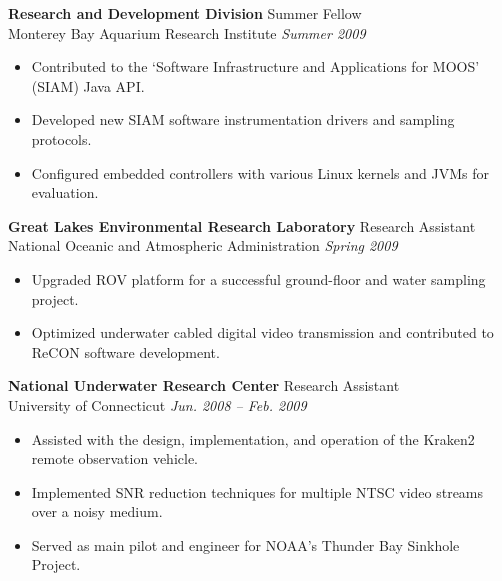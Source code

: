 \documentclass{article}
\begin{document}
{\begin{multicols}{2}
    \textbf{Research and Development Division} \hfill Summer Fellow \\ 
    Monterey Bay Aquarium Research Institute \hfill \textsl{Summer 2009}  \\
    \vspace{ -2 mm}	
    \begin{itemize}
	\item Contributed to the `Software Infrastructure and Applications for MOOS' (SIAM) Java API. 
	\item Developed new SIAM software instrumentation drivers and sampling protocols.
	\item Configured embedded controllers with various Linux kernels and JVMs for evaluation.
    \end{itemize}\vspace{-2mm}
    
    \textbf{Great Lakes Environmental Research Laboratory } \hfill  Research Assistant \\ 
	National Oceanic and Atmospheric Administration \hfill \textsl{Spring 2009} \\
    \vspace{ -2 mm}	
    \begin{itemize}
	\item Upgraded ROV platform for a successful ground-floor and water sampling project.
	\item Optimized underwater cabled digital video transmission and contributed to ReCON software development.
    \end{itemize}\vspace{-2mm}

    \textbf{National Underwater Research Center} \hfill Research Assistant \\ 
	University of Connecticut \hfill \textsl{Jun. 2008 -- Feb. 2009} \\
    \vspace{ -2 mm}	
    \begin{itemize}
	\item Assisted with the design, implementation, and operation of the Kraken2 remote observation vehicle.
	\item Implemented SNR reduction techniques for multiple NTSC video streams over a noisy medium.
	\item Served as main pilot and engineer for NOAA's Thunder Bay Sinkhole Project. 
    \end{itemize}\vspace{-2mm}


\end{multicols}}
\end{document}
